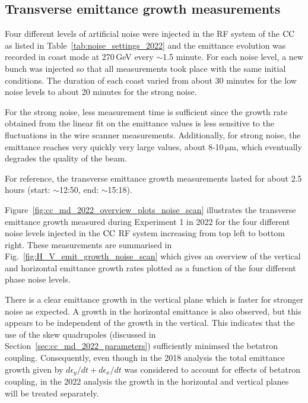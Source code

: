 \subsection{Transverse emittance growth measurements}\label{sec:cc_md_2022_exp1}
Four different levels of artificial noise were injected in the RF system of the ${\mathrm{CC}}$ as listed in Table~\ref{tab:noise_settings_2022} and the emittance evolution was recorded in coast mode at 270\,GeV every $\sim$1.5 minute. For each noise level, a new bunch was injected so that all measurements took place with the same initial conditions. The duration of each coast varied from about 30 minutes for the low noise levels to about 20 minutes for the strong noise. 

For the strong noise, less measurement time is sufficient since the growth rate obtained from the linear fit on the emittance values is less sensitive to the fluctuations in the wire scanner measurements. Additionally, for strong noise, the emittance reaches very quickly very large values, about 8-10\,$\mathrm{\mu m}$, which eventually degrades the quality of the beam.

For reference, the transverse emittance growth measurements lasted for about 2.5\,hours (start: $\sim$12:50, end: $\sim$15:18).

Figure~\ref{fig:cc_md_2022_overview_plots_noise_scan} illustrates the transverse emittance growth measured during Experiment 1 in 2022 for the four different noise levels injected in the ${\mathrm{CC}}$ RF system increasing from top left to bottom right. These measurements are summarised in Fig.~\ref{fig:H_V_emit_growth_noise_scan} which gives an overview of the vertical and horizontal emittance growth rates plotted as a function of the four different phase noise levels. 

There is a clear emittance growth in the vertical plane which is faster for stronger noise as expected. A growth in the horizontal emittance is also observed, but this appears to be independent of the growth in the vertical. This indicates that the use of the skew quadrupoles (discussed in Section~\ref{sec:cc_md_2022_parameters}) sufficiently minimsed the betatron coupling. Consequently, even though in the 2018 analysis the total emittance growth given by $d\epsilon_y/dt +d\epsilon_x/dt $ was considered to account for effects of betatron coupling, in the 2022 analysis the growth in the horizontal and vertical planes will be treated separately.


